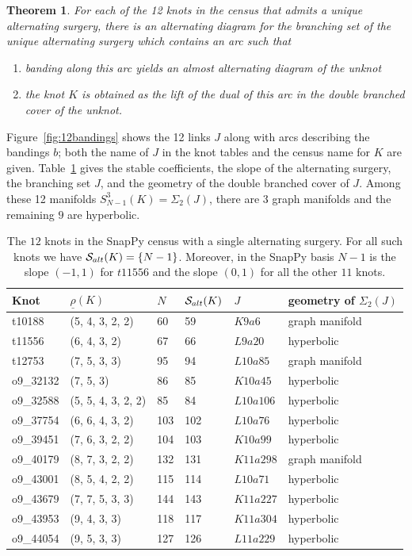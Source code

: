 \documentclass{amsart} %
\newcommand{\Salt}{\mathcal{S}_{\rm alt}}
\theoremstyle{thm}
\newtheorem{thm}[Theorem]{Theorem}
\theoremstyle{definition}
\newcommand{\ra}[1]{\renewcommand{\arraystretch}{#1}} %
\numberwithin{equation}{section}
\begin{document}
\begin{thm}\label{thm:bandings}
For each of the 12 knots in the census that admits a unique alternating surgery, there is an alternating diagram for the branching set of the unique alternating surgery which contains an arc such that
\begin{enumerate}
    \item banding along this arc yields an almost alternating diagram of the unknot
    \item the knot $K$ is obtained as the lift of the dual of this arc in the double branched cover of the unknot.
\end{enumerate}
\end{thm}

Figure~\ref{fig:12bandings} shows the 12 links $J$ along with arcs describing the bandings $b$; both the name of $J$ in the knot tables and the census name for $K$ are given.  Table~\ref{tab:uniqueinteger} gives the stable coefficients, the slope of the alternating surgery, the branching set $J$, and the geometry of the double branched cover of $J$. Among these 12 manifolds $S^3_{N-1}(K) = \Sigma_2(J)$, there are $3$ graph manifolds and the remaining $9$ are hyperbolic. 

 \begin{table}[htbp]
 	\caption{The $12$ knots in the SnapPy census with a single alternating surgery. For all such knots we have $\Salt(K)=\{N-1\}$. Moreover, in the SnapPy basis $N-1$ is the slope $(-1,1)$ for $t11556$ and the slope $(0,1)$ for all the other $11$ knots. 
 	}
	\label{tab:uniqueinteger}
	\ra{1.2}
	\begin{tabular}{@{}l|l|l|l|l|l@{}}
Knot & $\underline{\rho}(K)$ & $N$& $\Salt(K)$ &  $J$ & geometry of $\Sigma_2(J)$ \\ \hline
         t10188& (5, 4, 3, 2, 2)& 60 & 59& $K9a6$ &graph manifold\\
         t11556& (6, 4, 3, 2)&67& 66&  $L9a20$ & hyperbolic\\
         t12753 & (7, 5, 3, 3)&95& 94& $L10a85$& graph manifold\\
         o9\_32132& (7, 5, 3)&86& 85& $K10a45$& hyperbolic\\
         o9\_32588& (5, 5, 4, 3, 2, 2)&85& 84& $L10a106$& hyperbolic\\
         o9\_37754& (6, 6, 4, 3, 2)&103& 102& $L10a76$& hyperbolic \\
         o9\_39451& (7, 6, 3, 2, 2)& 104 & 103& $K10a99$& hyperbolic\\
         o9\_40179& (8, 7, 3, 2, 2)&132& 131& $K11a298$& graph manifold\\
         o9\_43001& (8, 5, 4, 2, 2)&115& 114& $L10a71$& hyperbolic\\
         o9\_43679& (7, 7, 5, 3, 3)&144& 143& $K11a227$& hyperbolic\\
         o9\_43953& (9, 4, 3, 3)&118& 117& $K11a304$ &hyperbolic\\
         o9\_44054& (9, 5, 3, 3)&127& 126& $L11a229$ &hyperbolic \\ 
	\end{tabular}
\end{table}
\end{document}
